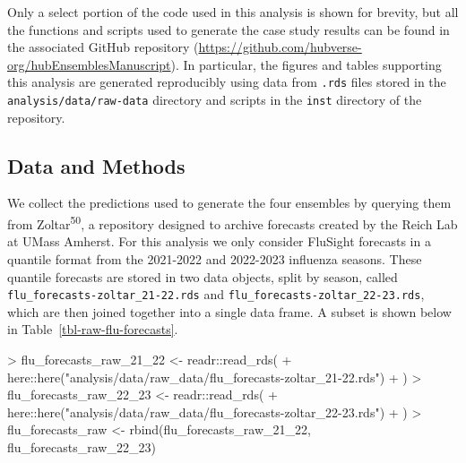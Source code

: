 \documentclass[
]{article}
\newenvironment{Shaded}{\begin{snugshade}}{\end{snugshade}}
\newcommand{\FunctionTok}[1]{\textcolor[rgb]{0.28,0.35,0.67}{#1}}
\newcommand{\NormalTok}[1]{\textcolor[rgb]{0.00,0.23,0.31}{#1}}
\newcommand{\OtherTok}[1]{\textcolor[rgb]{0.00,0.23,0.31}{#1}}
\newcommand{\SpecialCharTok}[1]{\textcolor[rgb]{0.37,0.37,0.37}{#1}}
\newcommand{\StringTok}[1]{\textcolor[rgb]{0.13,0.47,0.30}{#1}}
\begin{document}
Only a select portion of the code used in this analysis is shown for
brevity, but all the functions and scripts used to generate the case
study results can be found in the associated GitHub repository
(\url{https://github.com/hubverse-org/hubEnsemblesManuscript}). In
particular, the figures and tables supporting this analysis are
generated reproducibly using data from \texttt{.rds} files stored in the
\texttt{analysis/data/raw-data} directory and scripts in the
\texttt{inst} directory of the repository.

\subsection{Data and Methods}\label{data-and-methods}

We collect the predictions used to generate the four ensembles by
querying them from Zoltar\textsuperscript{50}, a repository designed to
archive forecasts created by the Reich Lab at UMass Amherst. For this
analysis we only consider FluSight forecasts in a quantile format from
the 2021-2022 and 2022-2023 influenza seasons. These quantile forecasts
are stored in two data objects, split by season, called
\texttt{flu\_forecasts-zoltar\_21-22.rds} and
\texttt{flu\_forecasts-zoltar\_22-23.rds}, which are then joined
together into a single data frame. A subset is shown below in
Table~\ref{tbl-raw-flu-forecasts}.

\begin{Shaded}
\begin{Highlighting}[]
\SpecialCharTok{\textgreater{}}\NormalTok{ flu\_forecasts\_raw\_21\_22 }\OtherTok{\textless{}{-}}\NormalTok{ readr}\SpecialCharTok{::}\FunctionTok{read\_rds}\NormalTok{(}
\SpecialCharTok{+}\NormalTok{   here}\SpecialCharTok{::}\FunctionTok{here}\NormalTok{(}\StringTok{"analysis/data/raw\_data/flu\_forecasts{-}zoltar\_21{-}22.rds"}\NormalTok{)}
\SpecialCharTok{+}\NormalTok{ )}
\SpecialCharTok{\textgreater{}}\NormalTok{ flu\_forecasts\_raw\_22\_23 }\OtherTok{\textless{}{-}}\NormalTok{ readr}\SpecialCharTok{::}\FunctionTok{read\_rds}\NormalTok{(}
\SpecialCharTok{+}\NormalTok{   here}\SpecialCharTok{::}\FunctionTok{here}\NormalTok{(}\StringTok{"analysis/data/raw\_data/flu\_forecasts{-}zoltar\_22{-}23.rds"}\NormalTok{)}
\SpecialCharTok{+}\NormalTok{ )}
\SpecialCharTok{\textgreater{}}\NormalTok{ flu\_forecasts\_raw }\OtherTok{\textless{}{-}} \FunctionTok{rbind}\NormalTok{(flu\_forecasts\_raw\_21\_22, flu\_forecasts\_raw\_22\_23)}
\end{Highlighting}
\end{Shaded}
\end{document}

